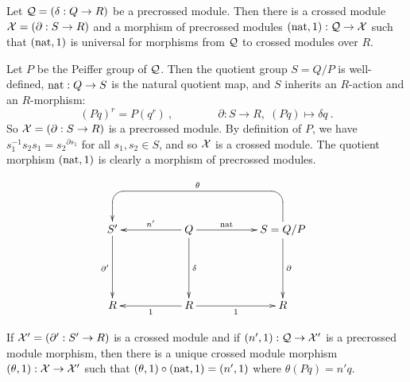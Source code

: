 \begin{prop}
Let   $\mathcal{Q} = (\delta : Q \to R)$  be a precrossed module.
Then there is a crossed module  $\mathcal{X} = (\partial : S \to R)$
and a morphism of precrossed modules  $(\mathrm{nat},1) : \mathcal{Q} \to \mathcal{X}$
such that  $(\mathrm{nat},1)$  is universal for morphisms from  $\mathcal{Q}$
to crossed modules over $R$.
\end{prop}
\begin{pf}
Let  $P$  be the Peiffer group of  $\mathcal{Q}$.
Then the quotient group  $S = Q/P$  is well-defined,
$\mathrm{nat} : Q \to S$  is the natural quotient map,
and  $S$  inherits an  $R$-action and an $R$-morphism: 
$$
(Pq)^r = P(q^r)~,
\qquad \qquad
\partial : S \to R,\; (Pq) \mapsto \delta q~.
$$
So  $\mathcal{X} = (\partial : S \to R)$  is a precrossed module.
By definition of  $P$, we have  $s_1^{-1}s_2s_1 = {s_2}^{\partial s_1}$
for all  $s_1,s_2 \in S$,  and so  $\mathcal{X}$  is a crossed module.
The quotient morphism  $(\mathrm{nat},1)$  is clearly a morphism of 
precrossed modules.

$$
\xy
\xymatrix{
   &&&&&&  \\
   &      S' \ar[dd]_{\partial'}
    &&    Q  \ar[rr]^(0.4){\nat} 
             \ar[ll]_{n'}  
             \ar[dd]^{\delta} 
      &&  S = Q/P  \ar[dd] ^{\partial}  
           \ar `u[-1,-1] `[0,-4]_{\theta} [0,-4]
        &    \\
   &&&&&& \\
   &      R 
    &&    R  \ar[ll]^1
             \ar[rr]_1
      &&  R
        & \\ 
}
\endxy
$$

\bigskip
If  $\mathcal{X}' = (\partial' : S' \to R)$  is a crossed module
and if  $(n',1) : \mathcal{Q} \to \mathcal{X}'$  is a precrossed module morphism,
then there is a unique crossed module morphism  
$(\theta,1) : \mathcal{X} \to \mathcal{X}'$
such that  $(\theta,1)\circ(\mathrm{nat},1) = (n',1)$  where  $\theta(Pq) = n'q$.
\end{pf}

